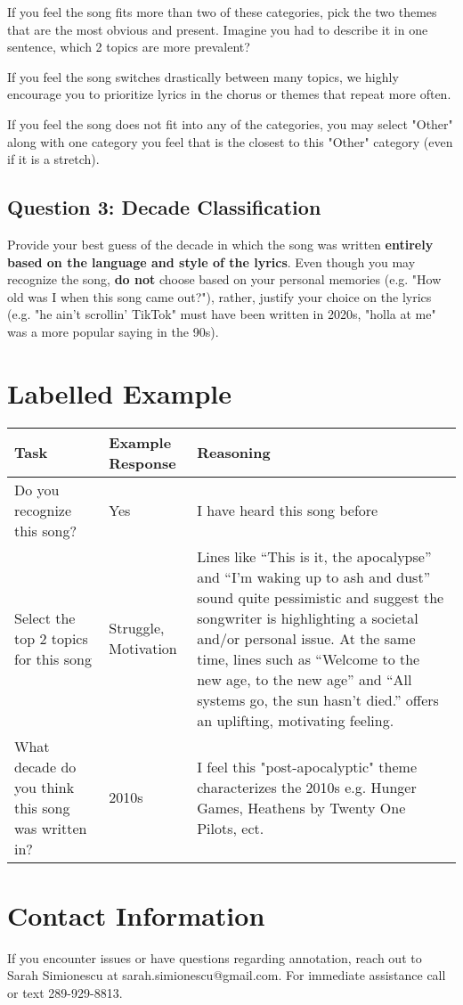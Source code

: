 \documentclass{article}
\begin{document}
If you feel the song fits more than two of these categories, pick the two themes that are the most obvious and present. Imagine you had to describe it in one sentence, which 2 topics are more prevalent?

If you feel the song switches drastically between many topics, we highly encourage you to prioritize lyrics in the chorus or themes that repeat more often.

If you feel the song does not fit into any of the categories, you may select "Other" along with one category you feel that is the closest to this "Other" category (even if it is a stretch).

\subsection{Question 3: Decade Classification}
Provide your best guess of the decade in which the song was written \textbf{entirely based on the language and style of the lyrics}. Even though you may recognize the song, \textbf{do not} choose based on your personal memories (e.g. "How old was I when this song came out?"), rather, justify your choice on the lyrics (e.g. "he ain't scrollin' TikTok" must have been written in 2020s, "holla at me" was a more popular saying in the 90s).

\section{Labelled Example}
\begin{tabular}{p{}|p{}|p{}}
\toprule
\textbf{Task} & \textbf{Example Response} & \textbf{Reasoning} \\
\midrule
Do you recognize this song? & Yes & I have heard this song before \\
\midrule
Select the top 2 topics for this song & Struggle, Motivation & Lines like ``This is it, the apocalypse'' and ``I'm waking up to ash and dust'' sound quite pessimistic and suggest the songwriter is highlighting a societal and/or personal issue. At the same time, lines such as ``Welcome to the new age, to the new age'' and ``All systems go, the sun hasn't died.'' offers an uplifting, motivating feeling. \\
\midrule
What decade do you think this song was written in? & 2010s &  I feel this "post-apocalyptic" theme characterizes the 2010s e.g. Hunger Games, Heathens by Twenty One Pilots, ect. \\
\bottomrule
\end{tabular}

\section{Contact Information}
If you encounter issues or have questions regarding annotation, reach out to Sarah Simionescu at sarah.simionescu@gmail.com. For immediate assistance call or text 289-929-8813.
\end{document}
